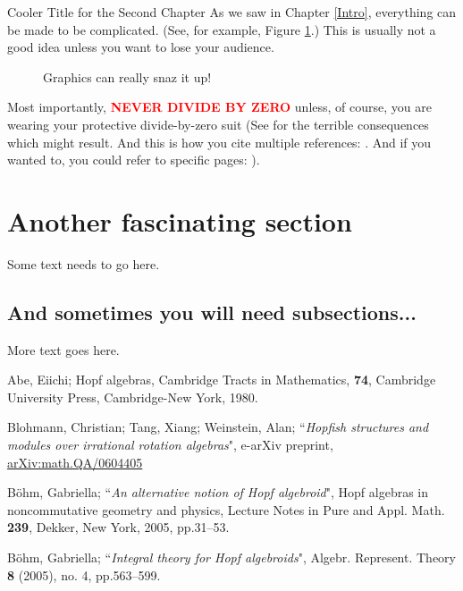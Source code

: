 \documentclass[12pt]{pom_thesis}
\begin{document}
\begin{chapter}{Cooler Title for the Second Chapter} As we saw in Chapter \ref{Intro}, everything can be
made to be complicated. (See, for example,  Figure \ref{fig1}.) This is usually not a good idea unless you want to lose your audience.

\begin{figure}
\caption{Graphics can really snaz it up!}
\label{fig1} %
\end{figure}

Most importantly, \textcolor{red}{\bf NEVER DIVIDE BY ZERO} unless, of course, you are wearing your protective
divide-by-zero suit (See \cite{Ab80} for the terrible consequences which might result. And this is how you cite multiple references: \cite{Ab80, BlTaWe, Bo1}. And if you wanted to, you could refer to specific pages: \cite[pages 567--569]{Bo2}).

\section{Another fascinating section}

Some text needs to go here.

\subsection{And sometimes you will need subsections...}

More text goes here.

\end{chapter}


\begin{thebibliography}{99}

 Abe, Eiichi; Hopf algebras, Cambridge Tracts in
Mathematics, \textbf{74}, Cambridge University Press, Cambridge-New York,
1980.

 Blohmann, Christian; Tang, Xiang; Weinstein, Alan;
``\textit{Hopfish structures and modules over irrational rotation algebras}",
e-arXiv preprint,
\href{http://arxiv.org/abs/math/0604405}{arXiv:math.QA/0604405}


 B\"{o}hm, Gabriella; ``\textit{An alternative notion of Hopf
algebroid}", Hopf algebras in noncommutative geometry and physics, Lecture
Notes in Pure and Appl. Math. \textbf{239}, Dekker, New York, 2005, pp.31--53.


 B\"{o}hm, Gabriella; ``\textit{Integral theory for Hopf
algebroids}", Algebr. Represent. Theory \textbf{8} (2005), no. 4, pp.563--599.


\end{thebibliography}
\end{document}
